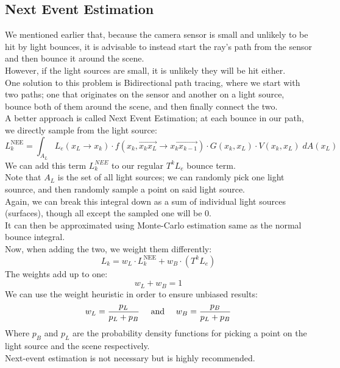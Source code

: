 \documentclass[12pt]{article}
\begin{document}
\subsection*{Next Event Estimation}

We mentioned earlier that, because the camera
sensor is small and unlikely to be hit by light
bounces, it is advisable to instead start the
ray's path from the sensor and then bounce
it around the scene. \\

However, if the light sources are small, it is unlikely
they will be hit either. \\

One solution to this problem is Bidirectional path
tracing, where we start with two paths;
one that originates on the sensor and another on
a light source, bounce both of them around the scene,
and then finally connect the two. \\

A better approach is called Next Event Estimation;
at each bounce in our path, we directly sample
from the light source:
\[ L_k^{\text{NEE}} = \int_{A_L} 
L_e(x_L \to x_k) \cdot 
f(x_k, \overrightarrow{x_k x_L} \to 
\overrightarrow{x_k x_{k-1}}) \cdot 
G(x_k, x_L) \cdot 
V(x_k, x_L) \; dA(x_L) \]
We can add this term $L_k^{NEE}$
to our regular $T^k L_e$ bounce term. \\

Note that $A_L$ is the set of all light sources;
we can randomly pick one light sounrce, and then
randomly sample a point on said light source. \\
Again, we can break this integral down
as a sum of individual light sources (surfaces),
though all except the sampled one will be $0$. \\

It can then be approximated using Monte-Carlo
estimation same as the normal bounce integral. \\

Now, when adding the two, we weight them differently:
\[ L_k = w_L \cdot L_k^\text{NEE} 
+ w_B \cdot (T^k L_e) \]
The weights add up to one:
\[ w_L + w_B = 1 \]
We can use the weight heuristic in order 
to ensure unbiased results:
\[ w_L = \dfrac{p_L}{p_L + p_B}
\quad \text{ and } \quad
w_B = \dfrac{p_B}{p_L + p_B} \]
Where $p_B$ and $p_L$ are the probability density 
functions for picking a point on the light source
and the scene respectively. \\

Next-event estimation is not necessary but is
highly recommended. \\
\end{document}
